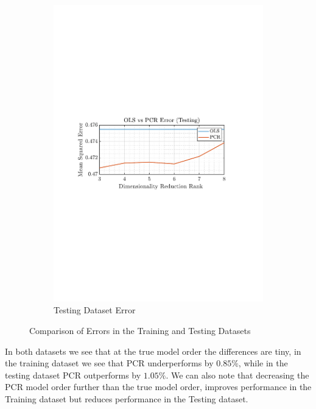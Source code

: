 \documentclass[12pt]{article}
\begin{document}
\begin{figure}[H]
\begin{subfigure}{0.49\textwidth}
		 			\includegraphics[trim={2.2cm 11.2cm 3.15cm  11.2cm}, clip, width=\textwidth]{../MATLAB/figures/q1_6c_fig02.pdf} 
		 			\captionsetup{justification=centering}
		 			\caption{Testing Dataset Error}
		 		\end{subfigure}
		 		\captionsetup{justification=centering}
		 		\caption{Comparison of Errors in the Training and Testing Datasets}
		 		\label{fig: 1-6c}
		 	\end{figure}
		 
		 	In both datasets we see that at the true model order the differences are tiny, in the training dataset we see that PCR underperforms by $0.85\%$, while in the testing dataset PCR outperforms by $1.05\%$. We can also note that decreasing the PCR model order further than the true model order, improves performance in the Training dataset but reduces performance in the Testing dataset.
		
\end{document}

